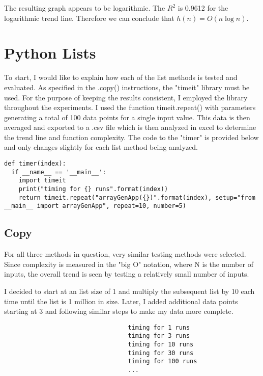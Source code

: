 \documentclass[12pt]{article}
\begin{document}
\noindent The resulting graph appears to be logarithmic. The $R^2$ is 0.9612 for the logarithmic trend line. Therefore we can conclude that $h(n) = O(n\log{n})$.

\section{Python Lists}

To start, I would like to explain how each of the list methods is tested and evaluated. As specified in the .copy() instructions, the "timeit" library must be used. For the purpose of keeping the results consistent, I employed the library throughout the experiments. I used the function timeit.repeat() with parameters generating a total of 100 data points for a single input value. This data is then averaged and exported to a .csv file which is then analyzed in excel to determine the trend line and function complexity. The code to the "timer" is provided below and only changes slightly for each list method being analyzed.
\scriptsize
\begin{verbatim}
def timer(index):
  if __name__ == '__main__':
    import timeit
    print("timing for {} runs".format(index))
    return timeit.repeat("arrayGenApp({})".format(index), setup="from __main__ import arrayGenApp", repeat=10, number=5)
\end{verbatim}
\normalsize

\subsection{Copy}
For all three methods in question, very similar testing methods were selected. Since complexity is measured in the "big O" notation, where N is the number of inputs, the overall trend is seen by testing a relatively small number of inputs. 

I decided to start at an list size of 1 and multiply the subsequent list by 10 each time until the list is 1 million in size. Later, I  added additional data points starting at 3 and following similar steps to make my data more complete. 

\footnotesize
\begin{verbatim}
                                  timing for 1 runs
                                  timing for 3 runs
                                  timing for 10 runs
                                  timing for 30 runs
                                  timing for 100 runs
                                  ...
\end{verbatim}
\normalsize
  
\end{document}
